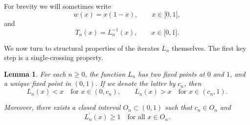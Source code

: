 \documentclass[onecolumn]{article}
\newtheorem{lemma}[theorem]{Lemma}
\begin{document}
For brevity we will sometimes write 
\begin{equation}
w(x)=x(1-x),\qquad x\in \lbrack 0,1],  \label{170b}
\end{equation}%
and 
\begin{equation}
T_{n}(x)=L_{n}^{-1}(x),\qquad x\in \lbrack 0,1].  \label{170c}
\end{equation}

We now turn to structural properties of the iterates $L_{n}$ themselves. The
first key step is a single-crossing property.

\begin{lemma}
\label{l-cross} For each $n\geq 0$, the function $L_{n}$ has two fixed
points at $0$ and $1$, and a unique fixed point in $(0,1)$. If we denote the
latter by $c_{n}$, then%
\begin{equation}
L_{n}(x)<x\quad \text{for }x\in (0,c_{n}),\qquad L_{n}(x)>x\quad \text{for }%
x\in (c_{n},1).  \label{170f}
\end{equation}

Moreover, there exists a closed interval $O_{n}\subset (0,1)$ such that $%
c_{n}\in O_{n}$ and 
\begin{equation}
L_{n}^{\prime }(x)\geq 1\quad \text{for all }x\in O_{n}.  \label{170g}
\end{equation}
\end{lemma}
\end{document}
